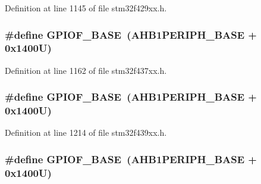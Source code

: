 Definition at line 1145 of file stm32f429xx.\+h.

\subsubsection[{\texorpdfstring{G\+P\+I\+O\+F\+\_\+\+B\+A\+SE}{GPIOF_BASE}}]{\setlength{\rightskip}{0pt plus 5cm}\#define G\+P\+I\+O\+F\+\_\+\+B\+A\+SE~({\bf A\+H\+B1\+P\+E\+R\+I\+P\+H\+\_\+\+B\+A\+SE} + 0x1400\+U)}\hypertarget{group___peripheral__memory__map_ga7f9a3f4223a1a784af464a114978d26e}{}\label{group___peripheral__memory__map_ga7f9a3f4223a1a784af464a114978d26e}


Definition at line 1162 of file stm32f437xx.\+h.

\subsubsection[{\texorpdfstring{G\+P\+I\+O\+F\+\_\+\+B\+A\+SE}{GPIOF_BASE}}]{\setlength{\rightskip}{0pt plus 5cm}\#define G\+P\+I\+O\+F\+\_\+\+B\+A\+SE~({\bf A\+H\+B1\+P\+E\+R\+I\+P\+H\+\_\+\+B\+A\+SE} + 0x1400\+U)}\hypertarget{group___peripheral__memory__map_ga7f9a3f4223a1a784af464a114978d26e}{}\label{group___peripheral__memory__map_ga7f9a3f4223a1a784af464a114978d26e}


Definition at line 1214 of file stm32f439xx.\+h.

\subsubsection[{\texorpdfstring{G\+P\+I\+O\+F\+\_\+\+B\+A\+SE}{GPIOF_BASE}}]{\setlength{\rightskip}{0pt plus 5cm}\#define G\+P\+I\+O\+F\+\_\+\+B\+A\+SE~({\bf A\+H\+B1\+P\+E\+R\+I\+P\+H\+\_\+\+B\+A\+SE} + 0x1400\+U)}\hypertarget{group___peripheral__memory__map_ga7f9a3f4223a1a784af464a114978d26e}{}\label{group___peripheral__memory__map_ga7f9a3f4223a1a784af464a114978d26e}



